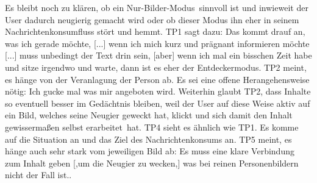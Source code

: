 \documentclass[12pt,a4paper,bibtotoc,abstracton]{scrartcl}
\begin{document}
Es bleibt noch zu klären, ob ein \glqq Nur-Bilder-Modus\grqq\ sinnvoll ist und inwieweit der User dadurch neugierig gemacht wird oder ob dieser Modus ihn eher in seinem Nachrichtenkonsumfluss stört und hemmt. TP1 sagt dazu: \glqq Das kommt drauf an, was ich gerade möchte, [...] wenn ich mich kurz und prägnant informieren möchte [...] muss unbedingt der Text drin sein, [aber] wenn ich mal ein bisschen Zeit habe und sitze irgendwo und warte, dann ist es eher der Entdeckermodus\grqq. TP2 meint, es hänge von der Veranlagung der Person ab. Es sei eine offene Herangehensweise nötig: \glqq Ich gucke mal was mir angeboten wird\grqq. Weiterhin glaubt TP2, dass Inhalte so eventuell besser im Gedächtnis bleiben, weil der User auf diese Weise aktiv auf ein Bild, welches seine Neugier geweckt hat, klickt und sich damit den Inhalt gewissermaßen selbst \glqq erarbeitet\grqq\ hat. TP4 sieht es ähnlich wie TP1. Es komme auf die Situation an und das Ziel des Nachrichtenkonsums an. TP5 meint, es hänge auch sehr stark vom jeweiligen Bild ab: \glqq Es muss eine klare Verbindung zum Inhalt geben [,um die Neugier zu wecken,] was bei reinen Personenbildern nicht der Fall ist.\grqq. 
\end{document}
